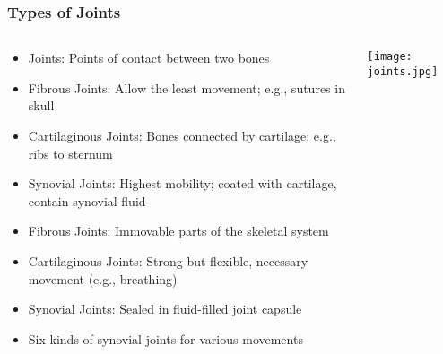 \begin{frame}[fragile]\frametitle{Types of Joints}
\begin{columns}
    \begin{column}[T]{0.6\linewidth}
      \begin{itemize}
		\item Joints: Points of contact between two bones
		\item Fibrous Joints: Allow the least movement; e.g., sutures in skull
		\item Cartilaginous Joints: Bones connected by cartilage; e.g., ribs to sternum
		\item Synovial Joints: Highest mobility; coated with cartilage, contain synovial fluid
		\item Fibrous Joints: Immovable parts of the skeletal system
		\item Cartilaginous Joints: Strong but flexible, necessary movement (e.g., breathing)
		\item Synovial Joints: Sealed in fluid-filled joint capsule
		\item Six kinds of synovial joints for various movements
	  \end{itemize}
    \end{column}
    \begin{column}[T]{0.4\linewidth}
		\begin{center}
		\texttt{[image: joints.jpg]} 
		\end{center}	
    \end{column}
  \end{columns}
\end{frame}

